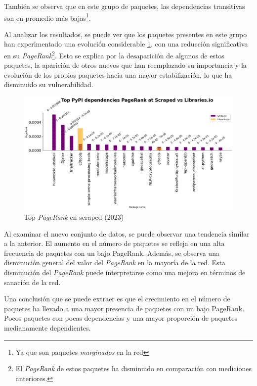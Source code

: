 También se observa que en este grupo de paquetes, las dependencias transitivas son en promedio
más bajas\footnote{Ya que son paquetes \textit{marginados} en la red}.

Al analizar los resultados, se puede ver que los paquetes presentes en este grupo han
experimentado una evolución considerable \ref{fig:Top PageRank en scraped}, con una reducción significativa en
su \textit{PageRank}\footnote{El \textit{PageRank} de estos paquetes ha disminuido
    en comparación con mediciones anteriores.}. Esto se explica por la desaparición de algunos
de estos paquetes, la aparición de otros nuevos que han reemplazado su importancia y
la evolución de los propios paquetes hacia una mayor estabilización, lo que ha disminuido
su vulnerabilidad.

\begin{figure}[ht!]
    \begin{center}
        \includegraphics[width=1\textwidth]{img/pypi/t20_dep_pr_scraped.png}
        \caption{Top \textit{PageRank} en scraped (2023)}
        \label{fig:Top PageRank en scraped}
    \end{center}
\end{figure}

Al examinar el nuevo conjunto de datos, se puede observar una tendencia similar a la anterior.
El aumento en el número de paquetes se refleja en una alta frecuencia de paquetes con un bajo
PageRank. Además, se observa una disminución general del valor del \textit{PageRank} en la mayoría de
la red. Esta disminución del \textit{PageRank} puede interpretarse como una mejora en términos de
sanación de la red.

Una conclusión que se puede extraer es que el crecimiento en el número de paquetes ha llevado
a una mayor presencia de paquetes con un bajo PageRank. Pocos paquetes con pocas dependencias y una mayor
proporción de paquetes medianamente dependientes.


